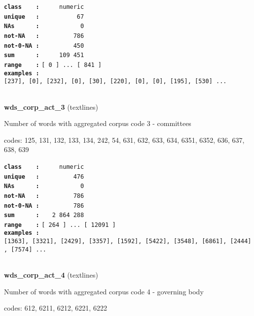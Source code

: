 \documentclass[]{article}
\begin{document}
\textbf{\texttt{class\ \ \ \ :}} \texttt{~~~~~numeric}\\
\textbf{\texttt{unique\ \ \ :}} \texttt{~~~~~~~~~~67}\\
\textbf{\texttt{NAs\ \ \ \ \ \ :}} \texttt{~~~~~~~~~~~0}\\
\textbf{\texttt{not-NA\ \ \ :}} \texttt{~~~~~~~~~786}\\
\textbf{\texttt{not-0-NA\ :}} \texttt{~~~~~~~~~450}\\
\textbf{\texttt{sum\ \ \ \ \ \ :}} \texttt{~~~~~109~451}\\
\textbf{\texttt{range\ \ \ \ :}}
\texttt{{[}\ 0\ {]}\ ...\ {[}\ 841\ {]}}\\
\textbf{\texttt{examples\ :}}
\texttt{{[}237{]},\ {[}0{]},\ {[}232{]},\ {[}0{]},\ {[}30{]},\ {[}220{]},\ {[}0{]},\ {[}0{]},\ {[}195{]},\ {[}530{]}\ ...}\\

~

\textbf{wds\_corp\_act\_3} (textlines)

Number of words with aggregated corpus code 3 - committees

codes: 125, 131, 132, 133, 134, 242, 54, 631, 632, 633, 634, 6351, 6352,
636, 637, 638, 639

\textbf{\texttt{class\ \ \ \ :}} \texttt{~~~~~numeric}\\
\textbf{\texttt{unique\ \ \ :}} \texttt{~~~~~~~~~476}\\
\textbf{\texttt{NAs\ \ \ \ \ \ :}} \texttt{~~~~~~~~~~~0}\\
\textbf{\texttt{not-NA\ \ \ :}} \texttt{~~~~~~~~~786}\\
\textbf{\texttt{not-0-NA\ :}} \texttt{~~~~~~~~~786}\\
\textbf{\texttt{sum\ \ \ \ \ \ :}} \texttt{~~~2~864~288}\\
\textbf{\texttt{range\ \ \ \ :}}
\texttt{{[}\ 264\ {]}\ ...\ {[}\ 12091\ {]}}\\
\textbf{\texttt{examples\ :}}
\texttt{{[}1363{]},\ {[}3321{]},\ {[}2429{]},\ {[}3357{]},\ {[}1592{]},\ {[}5422{]},\ {[}3548{]},\ {[}6861{]},\ {[}2444{]},\ {[}7574{]}\ ...}\\

~

\textbf{wds\_corp\_act\_4} (textlines)

Number of words with aggregated corpus code 4 - governing body

codes: 612, 6211, 6212, 6221, 6222
\end{document}
